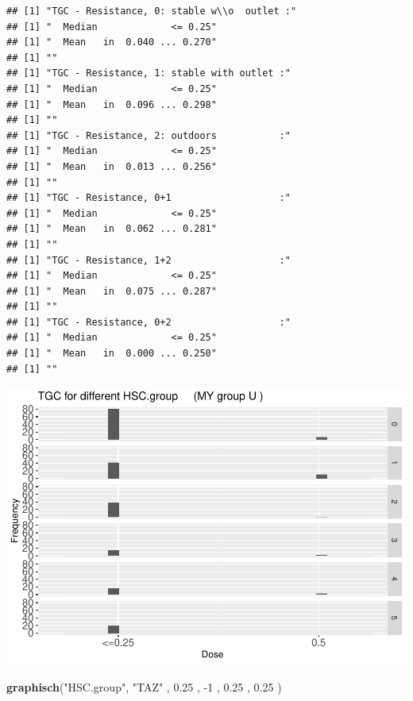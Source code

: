 \documentclass[
]{article}
\newenvironment{Shaded}{\begin{snugshade}}{\end{snugshade}}
\newcommand{\DecValTok}[1]{\textcolor[rgb]{0.00,0.00,0.81}{#1}}
\newcommand{\FloatTok}[1]{\textcolor[rgb]{0.00,0.00,0.81}{#1}}
\newcommand{\KeywordTok}[1]{\textcolor[rgb]{0.13,0.29,0.53}{\textbf{#1}}}
\newcommand{\NormalTok}[1]{#1}
\newcommand{\StringTok}[1]{\textcolor[rgb]{0.31,0.60,0.02}{#1}}
\begin{document}
\begin{verbatim}
## [1] "TGC - Resistance, 0: stable w\\o  outlet :"
## [1] "  Median             <= 0.25"
## [1] "  Mean   in  0.040 ... 0.270"
## [1] ""
## [1] "TGC - Resistance, 1: stable with outlet :"
## [1] "  Median             <= 0.25"
## [1] "  Mean   in  0.096 ... 0.298"
## [1] ""
## [1] "TGC - Resistance, 2: outdoors           :"
## [1] "  Median             <= 0.25"
## [1] "  Mean   in  0.013 ... 0.256"
## [1] ""
## [1] "TGC - Resistance, 0+1                   :"
## [1] "  Median             <= 0.25"
## [1] "  Mean   in  0.062 ... 0.281"
## [1] ""
## [1] "TGC - Resistance, 1+2                   :"
## [1] "  Median             <= 0.25"
## [1] "  Mean   in  0.075 ... 0.287"
## [1] ""
## [1] "TGC - Resistance, 0+2                   :"
## [1] "  Median             <= 0.25"
## [1] "  Mean   in  0.000 ... 0.250"
## [1] ""
\end{verbatim}

\includegraphics{Verteilungen_files/figure-latex/unnamed-chunk-49-1.pdf}

\begin{Shaded}
\begin{Highlighting}[]
   \KeywordTok{graphisch}\NormalTok{(}\StringTok{"HSC.group"}\NormalTok{, }\StringTok{"TAZ"}\NormalTok{ , }\FloatTok{0.25}\NormalTok{ ,  }\DecValTok{-1}\NormalTok{   ,   }\FloatTok{0.25}\NormalTok{ ,   }\FloatTok{0.25}\NormalTok{ )  }
\end{Highlighting}
\end{Shaded}
\end{document}
